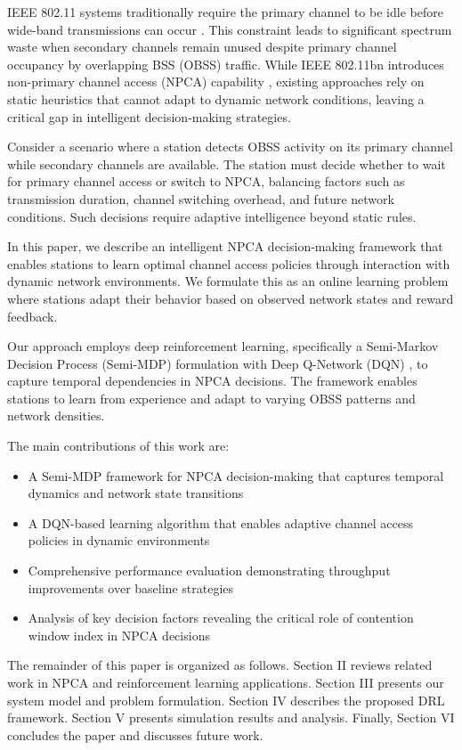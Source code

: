 \documentclass[conference]{IEEEtran}
\begin{document}
IEEE 802.11 systems traditionally require the primary channel to be idle before wide-band transmissions can occur \cite{wei2024non}. This constraint leads to significant spectrum waste when secondary channels remain unused despite primary channel occupancy by overlapping BSS (OBSS) traffic. While IEEE 802.11bn introduces non-primary channel access (NPCA) capability \cite{bellalta2025performance}, existing approaches rely on static heuristics that cannot adapt to dynamic network conditions, leaving a critical gap in intelligent decision-making strategies.

Consider a scenario where a station detects OBSS activity on its primary channel while secondary channels are available. The station must decide whether to wait for primary channel access or switch to NPCA, balancing factors such as transmission duration, channel switching overhead, and future network conditions. Such decisions require adaptive intelligence beyond static rules.

In this paper, we describe an intelligent NPCA decision-making framework that enables stations to learn optimal channel access policies through interaction with dynamic network environments. We formulate this as an online learning problem where stations adapt their behavior based on observed network states and reward feedback.

Our approach employs deep reinforcement learning, specifically a Semi-Markov Decision Process (Semi-MDP) formulation with Deep Q-Network (DQN) \cite{mnih2015human}, to capture temporal dependencies in NPCA decisions. The framework enables stations to learn from experience and adapt to varying OBSS patterns and network densities.

The main contributions of this work are:
\begin{itemize}
\item A Semi-MDP framework for NPCA decision-making that captures temporal dynamics and network state transitions
\item A DQN-based learning algorithm that enables adaptive channel access policies in dynamic environments  
\item Comprehensive performance evaluation demonstrating throughput improvements over baseline strategies
\item Analysis of key decision factors revealing the critical role of contention window index in NPCA decisions
\end{itemize}

The remainder of this paper is organized as follows. Section II reviews related work in NPCA and reinforcement learning applications. Section III presents our system model and problem formulation. Section IV describes the proposed DRL framework. Section V presents simulation results and analysis. Finally, Section VI concludes the paper and discusses future work.
\end{document}
